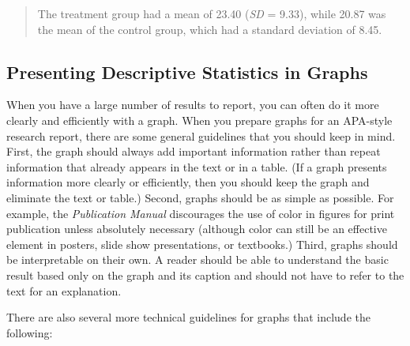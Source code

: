 \documentclass[
]{krantz}
\begin{document}
\begin{quote}
The treatment group had a mean of 23.40 (\emph{SD} = 9.33), while 20.87 was the mean of the control group, which had a standard deviation of 8.45.
\end{quote}

\subsection*{Presenting Descriptive Statistics in Graphs}\label{presenting-descriptive-statistics-in-graphs}


When you have a large number of results to report, you can often do it more clearly and efficiently with a graph. When you prepare graphs for an APA-style research report, there are some general guidelines that you should keep in mind. First, the graph should always add important information rather than repeat information that already appears in the text or in a table. (If a graph presents information more clearly or efficiently, then you should keep the graph and eliminate the text or table.) Second, graphs should be as simple as possible. For example, the \emph{Publication Manual} discourages the use of color in figures for print publication unless absolutely necessary (although color can still be an effective element in posters, slide show presentations, or textbooks.) Third, graphs should be interpretable on their own. A reader should be able to understand the basic result based only on the graph and its caption and should not have to refer to the text for an explanation.

There are also several more technical guidelines for graphs that include the following:
\end{document}
